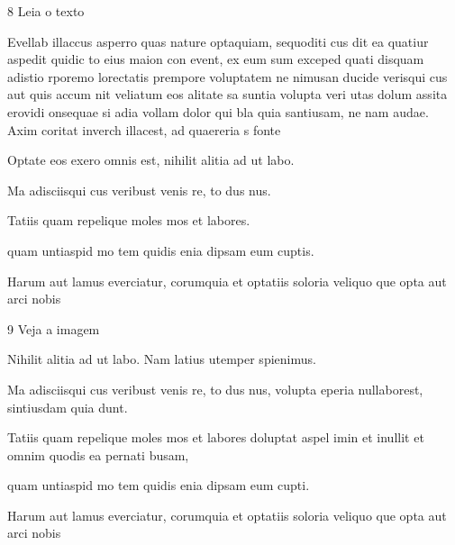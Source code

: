 \num{8} Leia o texto

Evellab illaccus asperro quas nature optaquiam, sequoditi cus dit ea quatiur
aspedit quidic to eius maion con event, ex eum sum exceped quati disquam
adistio rporemo lorectatis prempore voluptatem ne nimusan ducide verisqui
cus aut quis accum nit veliatum eos alitate sa suntia volupta veri utas dolum
assita erovidi onsequae si adia vollam dolor qui bla quia santiusam, ne nam
audae. Axim coritat inverch illacest, ad quaereria s
fonte

Optate eos exero omnis est, nihilit alitia ad ut labo.

\begin{escolha}
\item Ma adisciisqui cus veribust venis re, to dus nus.
\item Tatiis quam repelique moles mos et labores.
\item quam untiaspid mo tem quidis enia dipsam eum cuptis.
\item Harum aut lamus everciatur, corumquia et optatiis soloria veliquo que opta
aut arci nobis
\end{escolha}

\num{9} Veja a imagem


Nihilit alitia ad ut labo. Nam latius utemper spienimus.

\begin{boxlist}
\item Ma adisciisqui cus veribust venis re, to dus nus, volupta eperia nullaborest,
sintiusdam quia dunt.
\item Tatiis quam repelique moles mos et labores doluptat aspel imin et inullit et
omnim quodis ea pernati busam,
\item quam untiaspid mo tem quidis enia dipsam eum cupti.
\item Harum aut lamus everciatur, corumquia et optatiis soloria veliquo que opta
aut arci nobis
\end{boxlist}

\pagebreak

